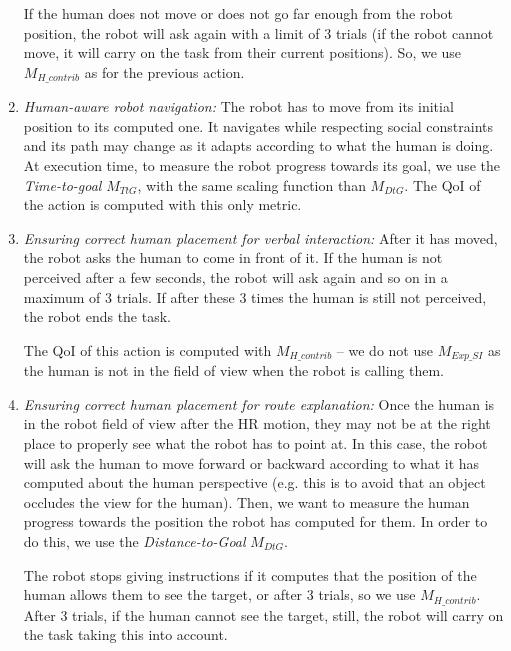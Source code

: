 \documentclass[a4paper,11pt,twoside]{StyleThese}
\begin{document}
\begin{enumerate}[label=(\alph*)]
	If the human does not move or does not go far enough from the robot position, the robot will ask again with a limit of 3 trials (if the robot cannot move, it will carry on the task from their current positions). So, we use $M_{H\_contrib}$ as for the previous action. 
	
	\item \label{list_act:nav} \textit{Human-aware robot navigation: }The robot has to move from its initial position to its computed one. It navigates while respecting social constraints and its path may change as it adapts according to what the human is doing. At execution time, to measure the robot progress towards its goal, we use the \textit{Time-to-goal} $M_{TtG}$, with the same scaling function than $M_{DtG}$. The QoI of the action is computed with this only metric. 
	
	\item \label{list_act:correct_place1} \textit{Ensuring correct human placement for verbal interaction: }After it has moved, the robot asks the human to come in front of it. If the human is not perceived after a few seconds, the robot will ask again and so on in a maximum of 3 trials. If after these 3 times the human is still not perceived, the robot ends the task. 
	
	The QoI of this action is computed with $M_{H\_contrib}$ -- we do not use $M_{Exp\_SI}$ as the human is not in the field of view when the robot is calling them.
	
	\item \label{list_act:correct_place2} \textit{Ensuring correct human placement for route explanation: }Once the human is in the robot field of view after the HR motion, they may not be at the right place to properly see what the robot has to point at. In this case, the robot will ask the human to move forward or backward according to what it has computed about the human perspective (e.g. this is to avoid that an object occludes the view for the human). Then, we want to measure the human progress towards the position the robot has computed for them. In order to do this, we use the \textit{Distance-to-Goal} $M_{DtG}$.
	
	The robot stops giving instructions if it computes that the position of the human allows them to see the target, or after 3 trials, so we use $M_{H\_contrib}$. After 3 trials, if the human cannot see the target, still, the robot will carry on the task taking this into account.
	
	
\end{enumerate}
\end{document}
